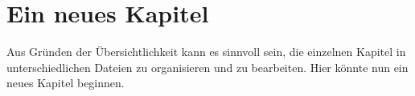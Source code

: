 \section{Ein neues Kapitel}

Aus Gründen der Übersichtlichkeit kann es sinnvoll sein, die einzelnen Kapitel in unterschiedlichen Dateien zu organisieren und zu bearbeiten. Hier könnte nun ein neues Kapitel beginnen.